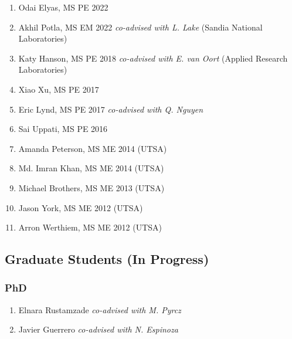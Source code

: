 \else
\begin{enumerate}
    \item Odai Elyas, MS PE 2022
    \item Akhil Potla, MS EM 2022 \emph{co-advised with L. Lake} (Sandia National Laboratories)
    \item Katy Hanson, MS PE 2018 \emph{co-advised with E. van Oort} (Applied Research Laboratories)
    \item Xiao Xu, MS PE 2017
    \item Eric Lynd, MS PE 2017  \emph{co-advised with Q. Nguyen}
    \item Sai Uppati, MS PE 2016
    \item Amanda Peterson, MS ME 2014 (UTSA)
    \item Md. Imran Khan, MS ME 2014 (UTSA)
    \item Michael Brothers, MS ME 2013 (UTSA)
    \item Jason York, MS ME 2012 (UTSA)
    \item Arron Werthiem, MS ME 2012 (UTSA)
\end{enumerate}
\fi

\subsection*{Graduate Students (In Progress)}



\subsubsection*{PhD}
\begin{enumerate}
    \item Elnara Rustamzade \emph{co-advised with M. Pyrcz}
    \item Javier Guerrero \emph{co-advised with N. Espinoza}
\end{enumerate}

